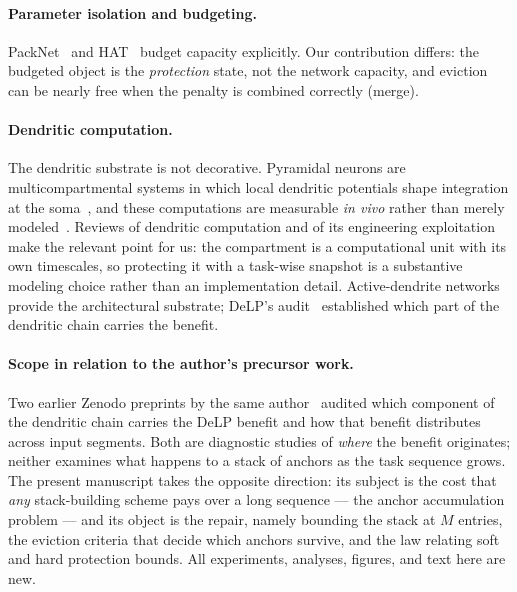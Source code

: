 \documentclass[review,11pt,number]{elsarticle}
\newcommand{\delp}{DeLP}
\begin{document}
\paragraph{Parameter isolation and budgeting.}
PackNet~\cite{mallya2018} and HAT~\cite{serra2018} budget capacity
explicitly. Our contribution differs: the budgeted object is the
\emph{protection} state, not the network capacity, and eviction can
be nearly free when the penalty is combined correctly (merge).

\paragraph{Dendritic computation.}
The dendritic substrate is not decorative. Pyramidal neurons are
multicompartmental systems in which local dendritic potentials shape
integration at the soma~\cite{chang1951,poirazi2003,beniaguev2021}, and
these computations are measurable \emph{in vivo} rather than merely
modeled~\cite{ujfalussy2018,zhang2026}. Reviews of dendritic computation
and of its engineering exploitation~\cite{london2005,poirazi2020,cardwell2025,boyle2025,baek2024,boahen2022}
make the relevant point for us: the compartment is a computational unit
with its own timescales, so protecting it with a task-wise snapshot is a
substantive modeling choice rather than an implementation detail.
Active-dendrite networks~\cite{iyer2022,onasch2026} provide the
architectural substrate; \delp{}'s audit~\cite{zhou2026delp}
established which part of the dendritic chain carries the benefit.

\paragraph{Scope in relation to the author's precursor work.} Two
earlier Zenodo preprints by the same author~\cite{zhou2026delp,zhou2026seg}
audited which component of the dendritic chain carries the DeLP benefit
and how that benefit distributes across input segments. Both are
diagnostic studies of \emph{where} the benefit originates; neither
examines what happens to a stack of anchors as the task sequence grows.
The present manuscript takes the opposite direction: its subject is the
cost that \emph{any} stack-building scheme pays over a long sequence
--- the anchor accumulation problem --- and its object is the repair,
namely bounding the stack at $M$ entries, the eviction criteria that
decide which anchors survive, and the law relating soft and hard
protection bounds. All experiments, analyses, figures, and text here are
new.
\end{document}
